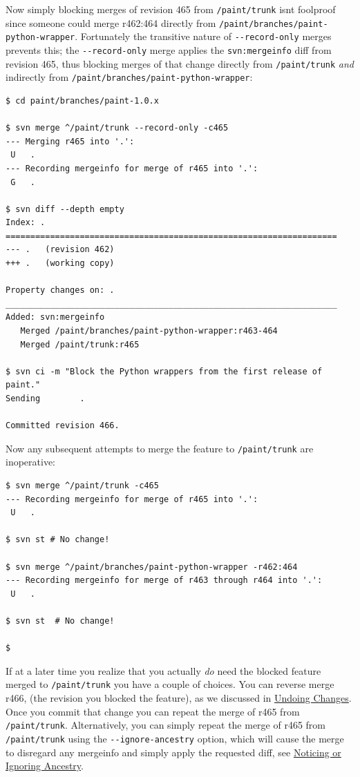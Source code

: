 Now simply blocking merges of revision 465 from \texttt{/paint/trunk}
isn\textquotesingle t foolproof since someone could merge r462:464
directly from \texttt{/paint/branches/paint-python-wrapper}. Fortunately
the transitive nature of \texttt{-\/-record-only} merges prevents this;
the \texttt{-\/-record-only} merge applies the \texttt{svn:mergeinfo}
diff from revision 465, thus blocking merges of that change directly
from \texttt{/paint/trunk} \emph{and} indirectly from
\texttt{/paint/branches/paint-python-wrapper}:

\begin{verbatim}
$ cd paint/branches/paint-1.0.x

$ svn merge ^/paint/trunk --record-only -c465
--- Merging r465 into '.':
 U   .
--- Recording mergeinfo for merge of r465 into '.':
 G   .

$ svn diff --depth empty
Index: .
===================================================================
--- .   (revision 462)
+++ .   (working copy)

Property changes on: .
___________________________________________________________________
Added: svn:mergeinfo
   Merged /paint/branches/paint-python-wrapper:r463-464
   Merged /paint/trunk:r465

$ svn ci -m "Block the Python wrappers from the first release of paint."
Sending        .

Committed revision 466.
\end{verbatim}

Now any subsequent attempts to merge the feature to
\texttt{/paint/trunk} are inoperative:

\begin{verbatim}
$ svn merge ^/paint/trunk -c465
--- Recording mergeinfo for merge of r465 into '.':
 U   .

$ svn st # No change!

$ svn merge ^/paint/branches/paint-python-wrapper -r462:464
--- Recording mergeinfo for merge of r463 through r464 into '.':
 U   .

$ svn st  # No change!

$
\end{verbatim}

If at a later time you realize that you actually \emph{do} need the
blocked feature merged to \texttt{/paint/trunk} you have a couple of
choices. You can reverse merge r466, (the revision you blocked the
feature), as we discussed in
\hyperref[svn.branchmerge.basicmerging.undo]{Undoing Changes}. Once you
commit that change you can repeat the merge of r465 from
\texttt{/paint/trunk}. Alternatively, you can simply repeat the merge of
r465 from \texttt{/paint/trunk} using the \texttt{-\/-ignore-ancestry}
option, which will cause the merge to disregard any mergeinfo and simply
apply the requested diff, see
\hyperref[svn.branchmerge.advanced.ancestry]{Noticing or Ignoring
Ancestry}.

